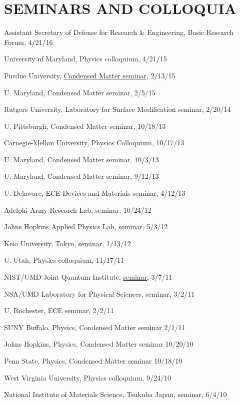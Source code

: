 \documentclass[paper=letter,fontsize=11pt]{scrartcl} %
\newcommand{\NewPart}[2]{\section*{\uppercase{#1} #2}}
\newcommand{\TalkEntry}[4]{
		\noindent #1, #2, #3 #4}
\begin{document}
\NewPart{Seminars and Colloquia}{}
\begin{etaremune}
\item\TalkEntry{Assistant Secretary of Defense for Research \& Engineering}{Basic Research Forum}{4/21/16}{}
\item\TalkEntry{University of Maryland}{Physics colloquium}{4/21/15}{}
\item\TalkEntry{Purdue University}{\href{https://nanohub.org/resources/21981}{Condensed Matter seminar}}{2/13/15}{}
\item\TalkEntry{U. Maryland}{Condensed Matter seminar}{2/5/15}{}
\item\TalkEntry{Rutgers University}{Laboratory for Surface Modification seminar}{2/20/14}{}
\item\TalkEntry{U. Pittsburgh}{Condensed Matter seminar}{10/18/13}{}
\item\TalkEntry{Carnegie-Mellon University}{Physics Colloquium}{10/17/13}{}
\item\TalkEntry{U. Maryland}{Condensed Matter seminar}{10/3/13}{}
\item\TalkEntry{U. Maryland}{Condensed Matter seminar}{9/12/13}{}
\item\TalkEntry{U. Delaware}{ECE Devices and Materials seminar}{4/12/13}{}
\item\TalkEntry{Adelphi Army Research Lab}{seminar}{10/24/12}{}
\item\TalkEntry{Johns Hopkins Applied Physics Lab}{seminar}{5/3/12}{}
\item\TalkEntry{Keio University, Tokyo}{\href{http://www.youtube.com/watch?v=m2FqCScR2go}{seminar}}{1/13/12}{}
\item\TalkEntry{U. Utah}{Physics colloquium}{11/17/11}{}
\item\TalkEntry{NIST/UMD Joint Quantum Institute}{\href{http://vimeo.com/29163750}{seminar}}{3/7/11}{}
\item\TalkEntry{NSA/UMD Laboratory for Physical Sciences}{seminar}{3/2/11}{}
\item\TalkEntry{U. Rochester}{ECE seminar}{2/2/11}{}
\item\TalkEntry{SUNY Buffalo}{Physics}{Condensed Matter seminar}{2/1/11}{}
\item\TalkEntry{Johns Hopkins}{Physics}{Condensed Matter seminar}{10/20/10}{}
\item\TalkEntry{Penn State}{Physics}{Condensed Matter seminar}{10/18/10}{}
\item\TalkEntry{West Virginia University}{Physics colloquium}{9/24/10}{}
\item\TalkEntry{National Institute of Materials Science, Tsukuba Japan}{seminar}{6/4/10}{}

\end{etaremune}
\end{document}
